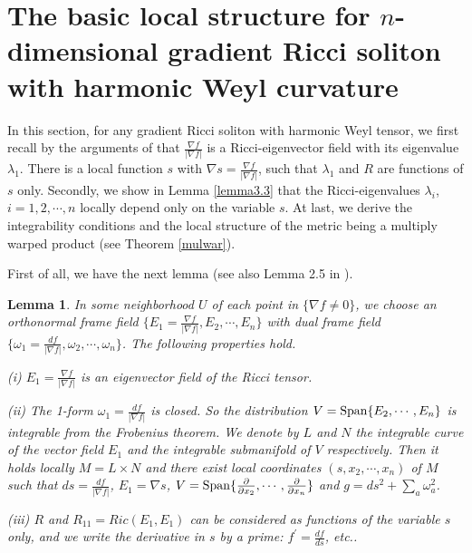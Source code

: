 \documentclass{amsart}
\newtheorem{lemma}[theorem]{Lemma}
\theoremstyle{definition}
\theoremstyle{remark}
\numberwithin{equation}{section}
\begin{document}
	\section{The basic local structure for $n$-dimensional gradient Ricci soliton with harmonic Weyl curvature}
	In this section, for any gradient Ricci soliton with harmonic Weyl tensor, 
	we first recall by the arguments of \cite{CC2,Kim} that 
	$\frac{\nabla f}{ | \nabla f | }$ is a Ricci-eigenvector field with its eigenvalue $\lambda_1$.
	There is a local function $s$ with $\nabla s =\frac{\nabla f}{ | \nabla f | }$, 
	such that $\lambda_1$ and $R$ are functions of $s$ only.
	Secondly, we show in Lemma \ref{lemma3.3} that
	the Ricci-eigenvalues $\lambda_i$, $i=1,2,\cdots, n$ locally depend only on the variable $s$.
	At last, we derive the integrability conditions and 
	the local structure of the metric being a multiply warped product (see Theorem \ref{mulwar}).
	
	First of all, we have the next lemma (see also Lemma 2.5 in \cite{Kim}).
	
	\begin{lemma} \label{lemma3.1}
		In some neighborhood $U$ of each point in $\{ \nabla f \neq 0  \}$, 
		we choose an orthonormal frame field
		$\{E_1= \frac{\nabla f}{|\nabla f| }, E_2, \cdots,  E_n \}$ 
		with dual frame field $\{\omega_1= \frac{d f}{|\nabla f| }, \omega_2, \cdots, \omega_n\}$.
		The following properties hold.
		
		\smallskip
		{\rm (i)} $E_1= \frac{\nabla f }{|\nabla f | }$ is an eigenvector field of the Ricci tensor.
		
		\smallskip
		{\rm (ii)} The 1-form $\omega_1= \frac{d f}{|\nabla f| }$ is closed. So the distribution
		$V={\rm Span}\{E_2, \cdots , E_n\}$ 
		is integrable from the Frobenius theorem. 
		We denote by $L$ and $N$ the integrable curve of the vector field $E_1$ and the integrable submanifold of $V$ respectively.
		Then it holds locally $M=L\times N$ 
		and there exist local coordinates $(s, x_2, \cdots , x_n)$ of $M$ such that 
		$ ds= \frac{d f}{|\nabla f|}$,  $E_1 = \nabla s$,
		$V={\rm Span} \{\frac{\partial}{\partial x_2}, \cdots , \frac{\partial}{\partial x_n}\} $
		and
		$g=ds^2+\sum_{a}\omega_a^2$.
		
		\smallskip
		{\rm (iii)} $R$ and $R_{11}= Ric (E_1, E_1)$ 
		can be considered as functions of the variable $s$ only, 
		and we write the derivative in $s$ by a prime: 
		$f^{'} = \frac{df}{ds}$, etc..
	\end{lemma}
	
\end{document}
